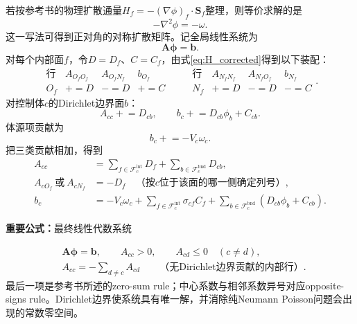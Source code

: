 \documentclass[UTF8,12pt,a4paper]{ctexart}
\numberwithin{equation}{section}
\newcommand{\keytitle}[1]{%
  \par\smallskip\noindent
  \colorbox{keybg}{\parbox{0.965\linewidth}{\color{keyblue}\textbf{重要公式：}#1}}
  \par\smallskip
}
\begin{document}
若按参考书的物理扩散通量$H_f=-(\nabla\phi)_f\cdot\bm S_f$整理，则等价求解的是
\begin{equation}
  -\nabla^2\phi=-\omega.
  \label{eq:negative_lap_equation}
\end{equation}
这一写法可得到正对角的对称扩散矩阵。记全局线性系统为
\begin{equation}
  \bm A\bm\phi=\bm b.
  \label{eq:matrix_general}
\end{equation}
对每个内部面$f$，令$D=D_f$、$C=C_f$，由式\eqref{eq:H_corrected}得到以下装配：
\begin{equation}
  \begin{array}{c|ccc}
  \text{行} & A_{O_fO_f} & A_{O_fN_f} & b_{O_f}\\
  \hline
  O_f & {+}{=}D & {-}{=}D & {+}{=}C
  \end{array}
  \qquad
  \begin{array}{c|ccc}
  \text{行} & A_{N_fN_f} & A_{N_fO_f} & b_{N_f}\\
  \hline
  N_f & {+}{=}D & {-}{=}D & {-}{=}C
  \end{array}.
  \label{eq:internal_matrix_assembly}
\end{equation}
对控制体$c$的Dirichlet边界面$b$：
\begin{equation}
  A_{cc}\mathrel{+}=D_{cb},
  \qquad
  b_c\mathrel{+}=D_{cb}\phi_b+C_{cb}.
  \label{eq:boundary_matrix_assembly}
\end{equation}
体源项贡献为
\begin{equation}
  b_c\mathrel{+}=-V_c\omega_c.
  \label{eq:source_matrix_assembly}
\end{equation}
把三类贡献相加，得到
\begin{align}
  A_{cc}
  &=\sum_{f\in\mathcal F_c^{\mathrm{int}}}D_f
    +\sum_{b\in\mathcal F_c^{\mathrm{bnd}}}D_{cb},
  \label{eq:diag_coefficient}\\
  A_{cO_f}\ \text{或}\ A_{cN_f}
  &=-D_f\quad\text{（按$c$位于该面的哪一侧确定列号）},
  \label{eq:offdiag_coefficient}\\
  b_c
  &=-V_c\omega_c
  +\sum_{f\in\mathcal F_c^{\mathrm{int}}}\sigma_{cf}C_f
  +\sum_{b\in\mathcal F_c^{\mathrm{bnd}}}
   \left(D_{cb}\phi_b+C_{cb}\right).
  \label{eq:rhs_coefficient}
\end{align}

\keytitle{最终线性代数系统}
\begin{equation}
  \boxed{
  \begin{aligned}
  &\bm A\bm\phi=\bm b,
  \qquad A_{cc}>0,
  \qquad A_{cd}\le0\quad(c\ne d),\\
  &A_{cc}=-\sum_{d\ne c}A_{cd}
  \qquad\text{（无Dirichlet边界贡献的内部行）}.
  \end{aligned}}
  \label{eq:matrix_key}
\end{equation}
最后一项是参考书所述的zero-sum rule；中心系数与相邻系数异号对应opposite-signs rule。Dirichlet边界使系统具有唯一解，并消除纯Neumann Poisson问题会出现的常数零空间。
\end{document}
